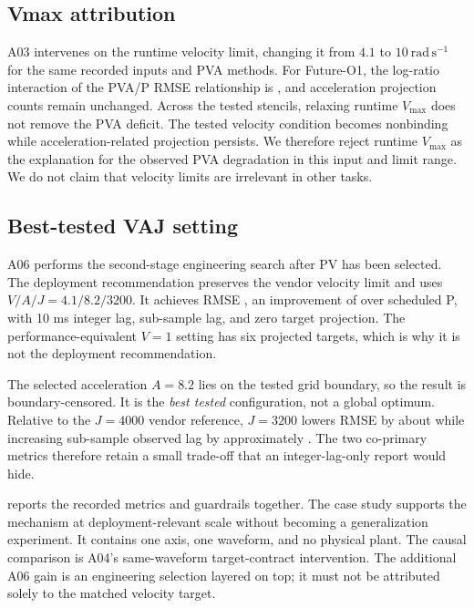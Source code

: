 \subsection{Vmax attribution}

A03 intervenes on the runtime velocity limit, changing it from $4.1$ to $10\ \mathrm{rad\,s^{-1}}$ for the same recorded inputs and PVA methods. For Future-O1, the log-ratio interaction of the PVA/P RMSE relationship is \VmaxInteraction, and acceleration projection counts remain unchanged. Across the tested stencils, relaxing runtime $V_{\max}$ does not remove the PVA deficit. The tested velocity condition becomes nonbinding while acceleration-related projection persists. We therefore reject runtime $V_{\max}$ as the explanation for the observed PVA degradation in this input and limit range. We do not claim that velocity limits are irrelevant in other tasks.

\subsection{Best-tested VAJ setting}

A06 performs the second-stage engineering search after PV \FutureOOne{} has been selected. The deployment recommendation preserves the vendor velocity limit and uses $V/A/J=4.1/8.2/3200$. It achieves RMSE \RecordedBestRMSE, an improvement of \RecordedBestReductionPercent{} over scheduled P, with 10 ms integer lag, \RecordedBestSubsampleLag{} sub-sample lag, and zero target projection. The performance-equivalent $V=1$ setting has six projected targets, which is why it is not the deployment recommendation.

The selected acceleration $A=8.2$ lies on the tested grid boundary, so the result is boundary-censored. It is the \emph{best tested} configuration, not a global optimum. Relative to the $J=4000$ vendor reference, $J=3200$ lowers RMSE by about \RecordedBestVsVendorReductionPercent{} while increasing sub-sample observed lag by approximately \RecordedBestLagTradeoff. The two co-primary metrics therefore retain a small trade-off that an integer-lag-only report would hide.




 reports the recorded metrics and guardrails together. The
case study supports the mechanism at deployment-relevant scale without becoming
a generalization experiment. It contains one axis, one waveform, and no physical
plant. The causal comparison is A04's same-waveform target-contract intervention.
The additional A06 gain is an engineering selection layered on top; it must not
be attributed solely to the matched velocity target.
